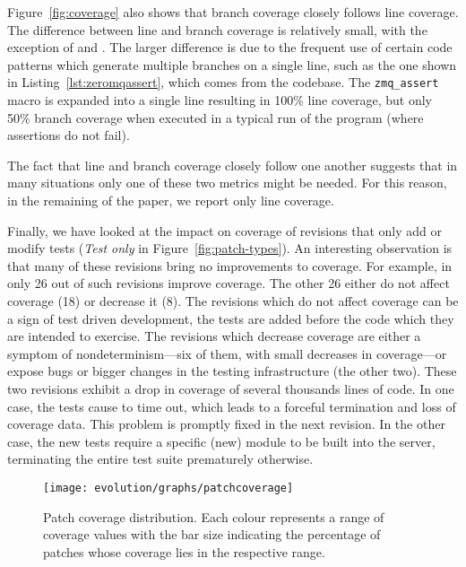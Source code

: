 Figure~\ref{fig:coverage} also shows that branch coverage closely
follows line coverage.  The difference between line and branch
coverage is relatively small, with the exception of \memcached
and \zeromq. The larger difference is due to the frequent use of
certain code patterns which generate multiple branches on a single
line, such as the one shown in Listing~\ref{lst:zeromqassert}, which
comes from the \zeromq codebase.  The \lstinline`zmq_assert` macro is
expanded into a single line resulting in 100\% line coverage, but only
50\% branch coverage when executed in a typical run of the program
(where assertions do not fail).

The fact that line and branch coverage closely follow one another
suggests that in many situations only one of these two metrics might be
needed.  For this reason, in the remaining of the paper, we report
only line coverage.

Finally, we have looked at the impact on coverage of revisions that
only add or modify tests (\textit{Test only} in
Figure~\ref{fig:patch-types}).  An interesting observation is that
many of these revisions bring no improvements to coverage. For
example, in \lighttpdtwo only 26 out of \lighttpdtwoOnlyTestRevs such
revisions improve coverage. The other 26 either do not affect coverage
(18) or decrease it (8).  The revisions which do not affect coverage
can be a sign of test driven development, \ie the tests are added
before the code which they are intended to exercise. The revisions
which decrease coverage are either a symptom of nondeterminism---six
of them, with small decreases in coverage---or expose bugs or bigger
changes in the testing infrastructure (the other two).  These two
revisions exhibit a drop in coverage of several thousands lines of
code. In one case, the tests cause \lighttpdtwo to time out, which leads
to a forceful termination and loss of coverage data.  This problem is
promptly fixed in the next revision.  In the other case, the new tests
require a specific (new) module to be built into the server,
terminating the entire test suite prematurely otherwise.

\begin{figure}[t]
\texttt{[image: evolution/graphs/patchcoverage]}
\caption{Patch coverage distribution. Each colour represents a range of
coverage values with the bar size indicating the percentage of patches whose
coverage lies in the respective range.}
\label{fig:patch-coverage}
\end{figure}

